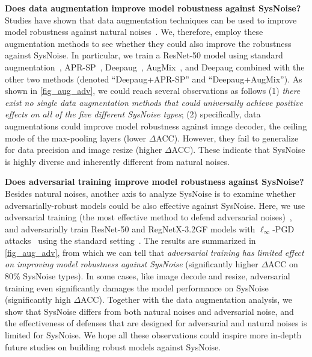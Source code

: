 \textbf{Does data augmentation improve model robustness against SysNoise?} %
Studies have shown that data augmentation techniques can be used to improve model robustness against natural noises~\cite{hendrycks2020augmix,hendrycks2021nae}. We, therefore, employ these augmentation methods to see whether they could also improve the robustness against SysNoise. In particular, we train a ResNet-50 model using standard augmentation~\cite{DBLP:journals/corr/HeZRS15}, APR-SP~\cite{chen2021amplitude}, Deepaug~\cite{hendrycks2020many}, AugMix~\cite{hendrycks2020augmix}, and Deepaug combined with the other two methods (denoted ``Deepaug+APR-SP'' and ``Deepaug+AugMix''). As shown in \autoref{fig_aug_adv}, we could reach several observations as follows (1) \emph{there exist no single data augmentation methods that could universally achieve positive effects on all of the five different SysNoise types}; (2) specifically, data augmentations could improve model robustness against image decoder, the ceiling mode of the max-pooling layers (lower $\Delta$ACC). However, they fail to generalize for data precision and image resize (higher $\Delta$ACC). These indicate that SysNoise is highly diverse and inherently different from natural noises.



\textbf{Does adversarial training improve model robustness against SysNoise?}
Besides natural noises, another axis to analyze SysNoise is to examine whether adversarially-robust models could be also effective against SysNoise. Here, we use adversarial training (the most effective method to defend adversarial noises)~\cite{PGD}, and adversarially train ResNet-50 and RegNetX-3.2GF models with $\ell_{\infty}$-PGD attacks~\cite{PGD} using the standard setting~\cite{tang2021robustart,croce2020robustbench}. The results are summarized in \autoref{fig_aug_adv}, from which we can tell that \emph{adversarial training has limited effect on improving model robustness against SysNoise} (significantly higher $\Delta$ACC on 80\% SysNoise types). In some cases, like image decode and resize, adversarial training even significantly damages the model performance on SysNoise (significantly high $\Delta$ACC). Together with the data augmentation analysis, we show that SysNoise differs from both natural noises and adversarial noise, and the effectiveness of defenses that are designed for adversarial and natural noises is limited for SysNoise. We hope all these observations could inspire more in-depth future studies on building robust models against SysNoise.

